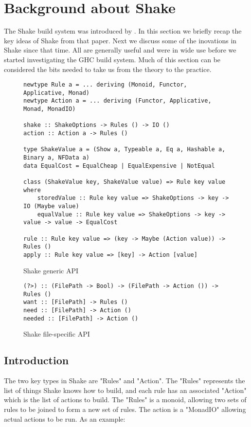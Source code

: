\section{Background about Shake\label{sec:shake}}

The Shake build system was introduced by \citet{shake}. In this section we briefly recap the key ideas of Shake from that paper. Next we discuss some of the inovations in Shake since that time. All are generally useful and were in wide use before we started investigating the GHC build system. Much of this section can be considered the bits needed to take us from the theory to the practice.

\begin{figure}
\begin{lstlisting}
newtype Rule a = ... deriving (Monoid, Functor, Applicative, Monad)
newtype Action a = ... deriving (Functor, Applicative, Monad, MonadIO)

shake :: ShakeOptions -> Rules () -> IO ()
action :: Action a -> Rules ()

type ShakeValue a = (Show a, Typeable a, Eq a, Hashable a, Binary a, NFData a)
data EqualCost = EqualCheap | EqualExpensive | NotEqual

class (ShakeValue key, ShakeValue value) => Rule key value where
    storedValue :: Rule key value => ShakeOptions -> key -> IO (Maybe value)
    equalValue :: Rule key value => ShakeOptions -> key -> value -> value -> EqualCost

rule :: Rule key value => (key -> Maybe (Action value)) -> Rules ()
apply :: Rule key value => [key] -> Action [value]
\end{lstlisting}
\caption{Shake generic API}
\end{figure}

\begin{figure}
\begin{lstlisting}
(?>) :: (FilePath -> Bool) -> (FilePath -> Action ()) -> Rules ()
want :: [FilePath] -> Rules ()
need :: [FilePath] -> Action ()
needed :: [FilePath] -> Action ()
\end{lstlisting}
\caption{Shake file-specific API}
\end{figure}

\subsection{Introduction}

The two key types in Shake are \lst"Rules" and \lst"Action". The \lst"Rules" represents the list of things Shake knows how to build, and each rule has an associated \lst"Action" which is the list of actions to build. The \lst"Rules" is a monoid, allowing two sets of rules to be joined to form a new set of rules. The action is a \lst"MonadIO" allowing actual actions to be run. As an example:

